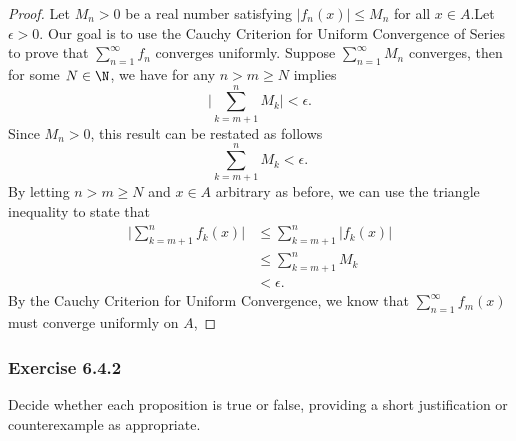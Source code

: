 \begin{proof}
Let \( M_n > 0  \) be a real number satisfying \( | f_n(x)  | \leq M_n  \) for all \( x \in A  \).Let \( \epsilon > 0 \). Our goal is to use the Cauchy Criterion for Uniform Convergence of Series to prove that \( \sum_{ n=1 }^{ \infty  } f_n  \) converges uniformly. Suppose \( \sum_{ n=1 }^{ \infty  } M_n  \) converges, then for some \( N \in \N  \), we have for any \( n > m \geq N  \) implies 
\[ \Big| \sum_{ k=m+1 }^{ n } M_k \Big| < \epsilon.   \]
Since \( M_n > 0  \), this result can be restated as follows
\[  \sum_{ k=m+1 }^{ n } M_k < \epsilon. \]
By letting \( n > m \geq N  \) and \( x \in A  \) arbitrary as before, we can use the triangle inequality to state that 
\begin{align*}
    \Big| \sum_{ k=m+1 }^{ n } f_k(x)  \Big| &\leq \sum_{ k=m+1 }^{ n }| f_k(x)  |  \\
                                             &\leq  \sum_{ k=m+1 }^{ n } M_k \\
                                             &< \epsilon.
\end{align*}
By the Cauchy Criterion for Uniform Convergence, we know that \( \sum_{ n=1 }^{ \infty  } f_m(x)  \) must converge uniformly on \( A  \),
\end{proof}

\subsubsection{Exercise 6.4.2} Decide whether each proposition is true or false, providing a short justification or counterexample as appropriate.  

